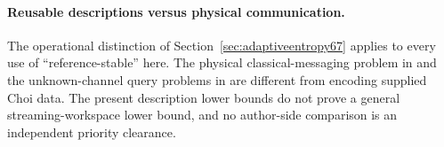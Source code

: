 \paragraph{Reusable descriptions versus physical communication.}
The operational distinction of Section~\ref{sec:adaptiveentropy67}
applies to every use of ``reference-stable'' here. The physical
classical-messaging problem in \cite{NZGB67} and the unknown-channel
query problems in \cite{MB67,OG67} are different from encoding supplied
Choi data. The present description lower bounds do not prove a general
streaming-workspace lower bound, and no author-side comparison is an
independent priority clearance.
